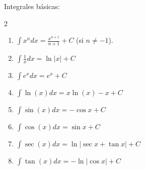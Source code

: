 \documentclass{article}
\begin{document}

Integrales básicas:
\begin{multicols}{2}
  \begin{enumerate}
    \item $\displaystyle\int x^n dx = \frac{x^{n+1}}{n+1}+C$ (si $n\neq -1$).
    \item $\displaystyle\int \frac{1}{x}dx = \ln|x|+C$
    \item $\displaystyle\int e^x dx = e^x+C$
    \item $\displaystyle\int \ln(x) dx = x\ln(x)-x+C$
    \item $\displaystyle\int \sin(x) dx = -\cos x+C$
    \item $\displaystyle\int \cos(x) dx = \sin x+C$
    \item $\displaystyle\int \sec(x) dx = \ln|\sec x+\tan x|+C$
    \item $\displaystyle\int \tan(x) dx = -\ln|\cos x|+C$
  \end{enumerate}
\end{multicols}
\vspace{2mm}
\end{document}

